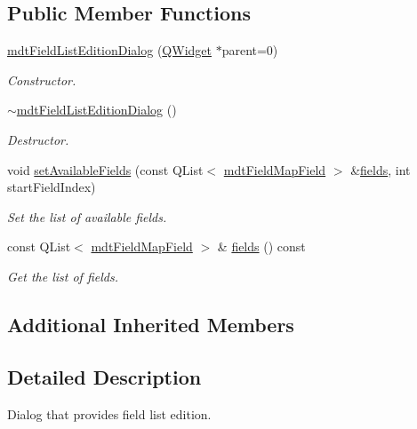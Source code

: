 \subsection*{Public Member Functions}
\begin{DoxyCompactItemize}
\item 
\hyperlink{classmdt_field_list_edition_dialog_a02c3cefeff70eedb41ff5caa2a52d5e4}{mdt\-Field\-List\-Edition\-Dialog} (\hyperlink{class_q_widget}{Q\-Widget} $\ast$parent=0)
\begin{DoxyCompactList}\small\item\em Constructor. \end{DoxyCompactList}\item 
\hyperlink{classmdt_field_list_edition_dialog_a39b7995b9ea9d7343ae09b2272b39b26}{$\sim$mdt\-Field\-List\-Edition\-Dialog} ()
\begin{DoxyCompactList}\small\item\em Destructor. \end{DoxyCompactList}\item 
void \hyperlink{classmdt_field_list_edition_dialog_a9eea066d1862f978c00e038471a95fff}{set\-Available\-Fields} (const Q\-List$<$ \hyperlink{classmdt_field_map_field}{mdt\-Field\-Map\-Field} $>$ \&\hyperlink{classmdt_field_list_edition_dialog_a10de0f00e5639bd3f2442f25423557ec}{fields}, int start\-Field\-Index)
\begin{DoxyCompactList}\small\item\em Set the list of available fields. \end{DoxyCompactList}\item 
const Q\-List$<$ \hyperlink{classmdt_field_map_field}{mdt\-Field\-Map\-Field} $>$ \& \hyperlink{classmdt_field_list_edition_dialog_a10de0f00e5639bd3f2442f25423557ec}{fields} () const 
\begin{DoxyCompactList}\small\item\em Get the list of fields. \end{DoxyCompactList}\end{DoxyCompactItemize}
\subsection*{Additional Inherited Members}


\subsection{Detailed Description}
Dialog that provides field list edition. 

